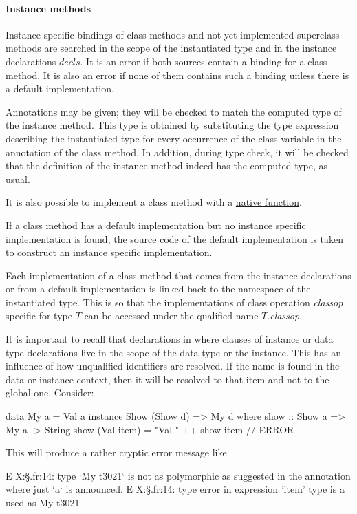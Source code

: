 \paragraph*{Instance methods}
Instance specific bindings of class methods and not yet implemented superclass methods are searched in the scope of the instantiated type and in the instance declarations $decls$.
It is an error if both sources contain a binding for a class method. It is also an error if none of them contains such a binding unless  there is a default implementation.

Annotations may be given; they will be checked to match the computed type of the instance method.
This type is obtained by substituting the type expression describing the instantiated type for every occurrence of the class variable in the annotation of the class method. In addition, during type check, it will be checked that the definition of the instance method indeed has the computed type, as usual.

It is also possible to implement a class method with a \hyperref[nativefun]{native function}.

If a class method has a default implementation but no instance specific implementation is found, the source code of the default implementation is taken to construct an instance specific implementation.

Each implementation of a class method that comes from the instance declarations or from a default implementation is linked back to the namespace of the instantiated type. This is so that the implementations of class operation \emph{classop} specific for type $T$ can be accessed under the qualified name $T$.\emph{classop}.

It is important to recall that declarations in where clauses of instance or data type declarations live in the scope of the data type or the instance. This has an influence of how unqualified identifiers are resolved. If the name is found in the data or instance context, then it will be resolved to that item and not to the global one. Consider:

\begin{code}
data My a = Val a
instance Show (Show d) => My d where
    show :: Show a => My a -> String 
    show (Val item) = "Val " ++ show item // ERROR
\end{code}

This will produce a rather cryptic error message like
\begin{code}
E X:\dev\frege\S.fr:14: type  `My t3021` is not as polymorphic
                as suggested  in the annotation where just  `a`
                is announced.
E X:\dev\frege\S.fr:14: type error in expression 'item'
        type is  a
        used as  My t3021
\end{code}


